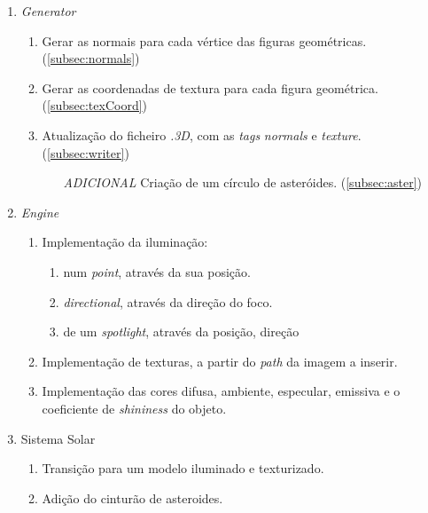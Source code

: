 \documentclass[runningheads]{llncs}
\begin{document}
    \begin{enumerate}
        \item \textit{Generator}
        \begin{enumerate}
            \item Gerar as normais para cada vértice das figuras geométricas. (\ref{subsec:normals})
            \item Gerar as coordenadas de textura para cada figura geométrica. (\ref{subsec:texCoord})
            \item Atualização do ficheiro \textit{.3D}, com as \textit{tags} 
                  \textit{normals} e \textit{texture}.(\ref{subsec:writer})
            \begin{enumerate}
                \item[\textit{ADICIONAL}]{Criação de um círculo de asteróides.} (\ref{subsec:aster})
            \end{enumerate}
        \end{enumerate}
        \item \textit{Engine}
        \begin{enumerate}
            \item Implementação da iluminação:
            \begin{enumerate}
                \item num \textit{point}, através da sua posição.
                \item \textit{directional}, através da direção do foco.
                \item de um \textit{spotlight}, através da posição, direção 
            \end{enumerate}
            \item Implementação de texturas, a partir do \textit{path} da imagem a inserir.
            \item Implementação das cores difusa, ambiente, especular, emissiva e o coeficiente
                  de \textit{shininess} do objeto.
        \end{enumerate}
        \item Sistema Solar 
        \begin{enumerate}
            \item Transição para um modelo iluminado e texturizado.
            \item Adição do cinturão de asteroides.
        \end{enumerate}
    \end{enumerate}
    
\end{document}
